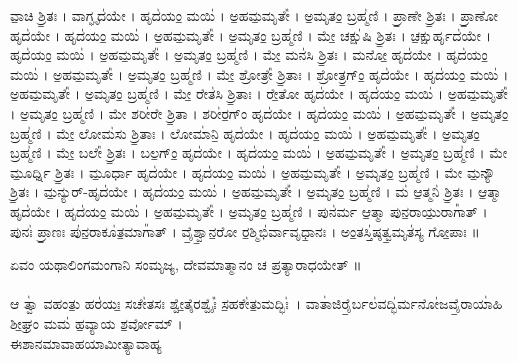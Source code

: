  ವಾ॒ಚಿ ಶ್ರಿ॒ತಃ । ವಾಗ್ಘೃದ॑ಯೇ । ಹೃದ॑ಯಂ॒ ಮಯಿ॑ । ಅ॒ಹಮ॒ಮೃತೇ᳚ । ಅ॒ಮೃತಂ॒ ಬ್ರಹ್ಮ॑ಣಿ ।  ಪ್ರಾ॒ಣೇ ಶ್ರಿ॒ತಃ । ಪ್ರಾ॒ಣೋ ಹೃದ॑ಯೇ । ಹೃದ॑ಯಂ॒ ಮಯಿ॑ । ಅ॒ಹಮ॒ಮೃತೇ᳚ । ಅ॒ಮೃತಂ॒ ಬ್ರಹ್ಮ॑ಣಿ ।  ಮೇ॒ ಚಕ್ಷು॑ಷಿ ಶ್ರಿ॒ತಃ । ಚ॒ಕ್ಷುರ್ಹೃದ॑ಯೇ । ಹೃದ॑ಯಂ॒ ಮಯಿ॑ । ಅ॒ಹಮ॒ಮೃತೇ᳚ । ಅ॒ಮೃತಂ॒ ಬ್ರಹ್ಮ॑ಣಿ ।  ಮೇ॒ ಮನ॑ಸಿ ಶ್ರಿ॒ತಃ । ಮನೋ॒ ಹೃದ॑ಯೇ । ಹೃದ॑ಯಂ॒ ಮಯಿ॑ । ಅ॒ಹಮ॒ಮೃತೇ᳚ । ಅ॒ಮೃತಂ॒ ಬ್ರಹ್ಮ॑ಣಿ ।  ಮೇ॒ ಶ್ರೋತ್ರೇ᳚ ಶ್ರಿ॒ತಾಃ । ಶ್ರೋತ್ರ॒ಗ್ಂ॒ ಹೃದ॑ಯೇ । ಹೃದ॑ಯಂ॒ ಮಯಿ॑ । ಅ॒ಹಮ॒ಮೃತೇ᳚ । ಅ॒ಮೃತಂ॒ ಬ್ರಹ್ಮ॑ಣಿ ।  ಮೇ॒ ರೇತ॑ಸಿ ಶ್ರಿ॒ತಾಃ । ರೇ॒ತೋ ಹೃದ॑ಯೇ । ಹೃದ॑ಯಂ॒ ಮಯಿ॑ । ಅ॒ಹಮ॒ಮೃತೇ᳚ । ಅ॒ಮೃತಂ॒ ಬ್ರಹ್ಮ॑ಣಿ ।  ಮೇ ಶರೀ॑ರೇ ಶ್ರಿ॒ತಾ । ಶರೀ॑ರ॒ಗ್ಂ ಹೃದ॑ಯೇ । ಹೃದ॑ಯಂ॒ ಮಯಿ॑ । ಅ॒ಹಮ॒ಮೃತೇ᳚ । ಅ॒ಮೃತಂ॒ ಬ್ರಹ್ಮ॑ಣಿ ।  ಮೇ॒ ಲೋಮ॑ಸು ಶ್ರಿ॒ತಾಃ । ಲೋಮಾ॑ನಿ॒ ಹೃದ॑ಯೇ । ಹೃದ॑ಯಂ॒ ಮಯಿ॑ । ಅ॒ಹಮ॒ಮೃತೇ᳚ । ಅ॒ಮೃತಂ॒ ಬ್ರಹ್ಮ॑ಣಿ ।  ಮೇ॒ ಬಲೇ᳚ ಶ್ರಿ॒ತಃ । ಬಲ॒ಗ್ಂ॒ ಹೃದ॑ಯೇ । ಹೃದ॑ಯಂ॒ ಮಯಿ॑ । ಅ॒ಹಮ॒ಮೃತೇ᳚ । ಅ॒ಮೃತಂ॒ ಬ್ರಹ್ಮ॑ಣಿ ।  ಮೇ ಮೂ॒ರ್ಧ್ನಿ ಶ್ರಿ॒ತಃ । ಮೂ॒ರ್ಧಾ ಹೃದ॑ಯೇ । ಹೃದ॑ಯಂ॒ ಮಯಿ॑ । ಅ॒ಹಮ॒ಮೃತೇ᳚ । ಅ॒ಮೃತಂ॒ ಬ್ರಹ್ಮ॑ಣಿ ।  ಮೇ ಮ॒ನ್ಯೌ ಶ್ರಿ॒ತಃ । ಮ॒ನ್ಯುರ್-ಹೃದ॑ಯೇ । ಹೃದ॑ಯಂ॒ ಮಯಿ॑ । ಅ॒ಹಮ॒ಮೃತೇ᳚ । ಅ॒ಮೃತಂ॒ ಬ್ರಹ್ಮ॑ಣಿ ।  ಮ॑ ಆ॒ತ್ಮನಿ॑ ಶ್ರಿ॒ತಃ । ಆ॒ತ್ಮಾ ಹೃದ॑ಯೇ । ಹೃದ॑ಯಂ॒ ಮಯಿ॑ । ಅ॒ಹಮ॒ಮೃತೇ᳚ । ಅ॒ಮೃತಂ॒ ಬ್ರಹ್ಮ॑ಣಿ । ಪುನ॑ರ್ಮ ಆ॒ತ್ಮಾ ಪುನ॒ರಾಯು॒ರಾಗಾ᳚ತ್ । ಪುನಃ॑ ಪ್ರಾ॒ಣಃ ಪು॑ನ॒ರಾಕೂ॑ತ॒ಮಾಗಾ᳚ತ್ । ವೈ॒ಶ್ವಾ॒ನ॒ರೋ ರ॒ಶ್ಮಿಭಿ॑ರ್ವಾವೃಧಾ॒ನಃ । ಅಂ॒ತಸ್ತಿ॑ಷ್ಠತ್ವ॒ಮೃತ॑ಸ್ಯ ಗೋ॒ಪಾಃ ॥

ಏವಂ ಯಥಾಲಿಂಗಮಂಗಾನಿ ಸಂಮೃಜ್ಯ, ದೇವಮಾತ್ಮಾನಂ ಚ ಪ್ರತ್ಯಾರಾಧಯೇತ್ ॥\\
\\
ಆ ತ್ವಾ॑ ವಹಂತು॒ ಹರ॑ಯಃ॒ ಸಚೇ॑ತಸಃ ಶ್ವೇ॒ತೈರಶ್ವೈಃ᳚  ಸ॒ಹಕೇ॑ತು॒ಮದ್ಭಿಃ॑~। ವಾತಾ॑ಜಿರೈ॒ರ್ಬಲ॑ವದ್ಭಿ॑ರ್ಮನೋ॑ಜವೈ॒ರಾಯಾ॑ಹಿ ಶೀ॒ಘ್ರಂ ಮಮ॑ ಹ॒ವ್ಯಾಯ ಶ॒ರ್ವೋಮ್ ।\\ ಈಶಾನಮಾವಾಹಯಾಮೀತ್ಯಾವಾಹ್ಯ\\
